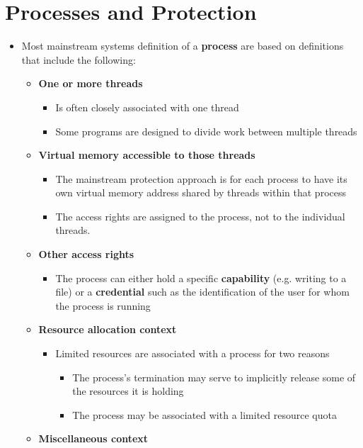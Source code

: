 \documentclass[11pt]{article}
\providecommand{\tightlist}{%
      \setlength{\itemsep}{0pt}\setlength{\parskip}{0pt}}
\begin{document}
    \section{Processes and Protection}\label{processes-and-protection}

\begin{itemize}
\tightlist
\item
  Most mainstream systems definition of a \textbf{process} are based on
  definitions that include the following:

  \begin{itemize}
  \tightlist
  \item
    \textbf{One or more threads}

    \begin{itemize}
    \tightlist
    \item
      Is often closely associated with one thread
    \item
      Some programs are designed to divide work between multiple threads
    \end{itemize}
  \item
    \textbf{Virtual memory accessible to those threads}

    \begin{itemize}
    \tightlist
    \item
      The mainstream protection approach is for each process to have its
      own virtual memory address shared by threads within that process
    \item
      The access rights are assigned to the process, not to the
      individual threads.
    \end{itemize}
  \item
    \textbf{Other access rights}

    \begin{itemize}
    \tightlist
    \item
      The process can either hold a specific \textbf{capability} (e.g.
      writing to a file) or a \textbf{credential} such as the
      identification of the user for whom the process is running
    \end{itemize}
  \item
    \textbf{Resource allocation context}

    \begin{itemize}
    \tightlist
    \item
      Limited resources are associated with a process for two reasons

      \begin{itemize}
      \tightlist
      \item
        The process's termination may serve to implicitly release some
        of the resources it is holding
      \item
        The process may be associated with a limited resource quota
      \end{itemize}
    \end{itemize}
  \item
    \textbf{Miscellaneous context}


\end{itemize}
\end{itemize}
\end{document}

